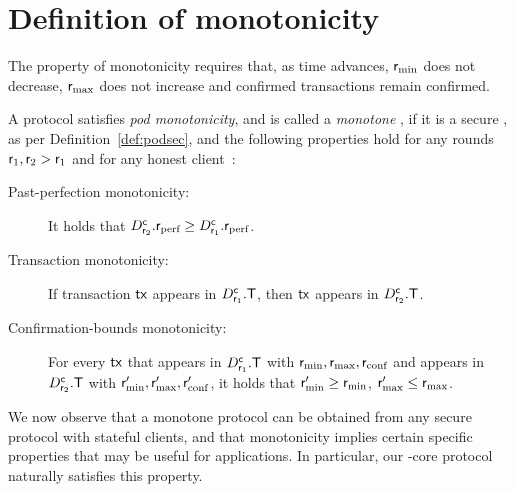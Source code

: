 \section{Definition of \podtm monotonicity}\label{app:monotonicity}

The property of \podtm monotonicity requires that, as time advances, $\textsf{r}_\text{min}$ does not decrease, $\textsf{r}_\text{max}$ does not increase and confirmed transactions remain confirmed.


\begin{definition}
	A \podtm protocol satisfies \emph{pod monotonicity}, and is called a \emph{monotone \podtm}, if it is a secure \podtm, as per Definition~\ref{def:podsec}, and the following properties hold for any rounds $\textsf{r}_1,\textsf{r}_2 > \textsf{r}_1$ and for any honest client~\client:
	\begin{description}
		\item [Past-perfection monotonicity:] It holds that $D_{\textsf{r}_2}^{\textsf{c}}.\textsf{r}_\text{perf} \geq D_{\textsf{r}_1}^{\textsf{c}}.\textsf{r}_\text{perf}$.
		\item [Transaction monotonicity:] If  transaction $\textsf{tx}$ appears in $D_{\textsf{r}_1}^{\textsf{c}}.\textsf{T}$, then $\textsf{tx}$ appears in $D_{\textsf{r}_2}^{\textsf{c}}.\textsf{T}$.
		\item [Confirmation-bounds monotonicity:] For every $\textsf{tx}$ that appears in $D_{\textsf{r}_1}^{\textsf{c}}.\textsf{T}$ with $\textsf{r}_\text{min},\textsf{r}_\text{max},\textsf{r}_\text{conf}$ and appears in  $D_{\textsf{r}_2}^{\textsf{c}}.\textsf{T}$ with $\textsf{r}_\text{min}',\textsf{r}_\text{max}',\textsf{r}_\text{conf}'$,  it holds that $\textsf{r}_\text{min}'\geq \textsf{r}_\text{min}$, $\textsf{r}_\text{max}' \leq \textsf{r}_\text{max}$.

	\end{description}
\end{definition}

We now observe that a monotone \podtm protocol can be obtained from any secure \podtm protocol with stateful clients, and that monotonicity implies certain specific properties that may be useful for applications. In particular, our \podtm-core protocol naturally satisfies this property.


